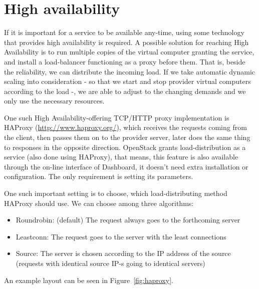 \documentclass[a4paper]{article}
\begin{document}
\section{High availability}

If it is important for a service to be available any-time, using some technology that provides high availability is
required. A possible solution for reaching High Availability is to run multiple copies of the virtual computer granting
the service, and install a load-balancer functioning as a proxy before them. That is, beside the reliability, we can
distribute the incoming load. If we take automatic dynamic scaling into consideration - so that we start and stop
provider virtual computers according to the load -, we are able to adjust to the changing demands and we only use the
necessary resources.

One such High Availability-offering TCP/HTTP proxy implementation is HAProxy (\url{http://www.haproxy.org/}), which
receives the requests coming from the client, then passes them on to the provider server, later does the same thing to
responses in the opposite direction. OpenStack grants load-distribution as a service (also done using HAProxy), that
means, this feature is also available through the on-line interface of Dashboard, it doesn't need extra installation or
configuration. The only requirement is setting its parameters.

One such important setting is to choose, which load-distributing method HAProxy should use. We can choose among three
algorithms:
\begin{itemize}
    \item Roundrobin: (default) The request always goes to the forthcoming server
    \item Leastconn: The request goes to the server with the least connections
    \item Source: The server is chosen according to the IP address of the source (requests with identical source IP-s going
          to identical servers)
\end{itemize}
An example layout can be seen in Figure~\ref{fig:haproxy}.
\end{document}
